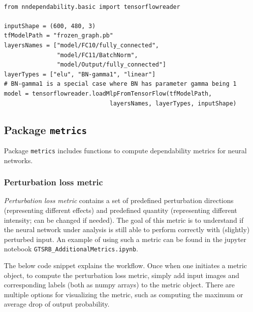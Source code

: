 \documentclass{article}
\begin{document}
\begin{small}
\color{blue}
\begin{verbatim}

from nndependability.basic import tensorflowreader

inputShape = (600, 480, 3)
tfModelPath = "frozen_graph.pb"
layersNames = ["model/FC10/fully_connected", 
               "model/FC11/BatchNorm", 
               "model/Output/fully_connected"]
layerTypes = ["elu", "BN-gamma1", "linear"]
# BN-gamma1 is a special case where BN has parameter gamma being 1
model = tensorflowreader.loadMlpFromTensorFlow(tfModelPath, 
                              layersNames, layerTypes, inputShape)
\end{verbatim}
\end{small}



\subsection{Package \texttt{metrics}}

Package \texttt{metrics} includes functions to compute dependability metrics for neural networks. 


\subsubsection{Perturbation loss metric}

\emph{Perturbation loss metric} contains a set of predefined perturbation directions (representing different effects) and predefined quantity (representing different intensity; can be changed if needed). The goal of this metric is to understand if the neural network under analysis is still able to perform correctly with (slightly) perturbed input. An example of using such a metric can be found in the jupyter notebook \texttt{GTSRB\_AdditionalMetrics.ipynb}.   

The below code snippet explains the workflow. Once when one initiates a metric object, to compute the perturbation loss metric, simply add  input images and corresponding labels (both as numpy arrays) to the metric object. There are multiple options for visualizing the metric, such as computing the maximum or average drop of output probability.  
\end{document}
